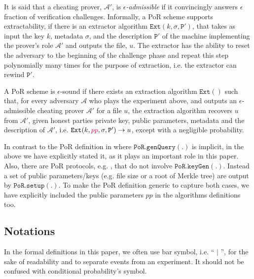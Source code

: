 It is said that a cheating prover, $\mathcal{A}'$, is \emph{$\epsilon$-admissible} if it convincingly answers $\epsilon$ fraction of verification challenges. Informally, a PoR scheme supports extractability, if there is an extractor algorithm $\mathtt{Ext}(k,\sigma, \mathtt{P}')$, that takes as input the key $k$, metadata $\sigma$, and the description $\mathtt{P}'$ of the  machine implementing the prover's role $\mathcal{A}'$ and outputs the file, $u$. The extractor has the ability to reset the adversary to the beginning of the challenge phase and repeat this step polynomially many times for the purpose of extraction, i.e. the extractor can rewind $\mathtt{P}'$.




\begin{definition}\label{extractable} A PoR scheme is $\epsilon$-sound if   there exists an extraction algorithm $\mathtt{Ext}()$ such that, for every adversary $\mathcal{A}$ who plays the experiment above, and outputs an $\epsilon$-admissible cheating prover $\mathcal{A}'$ for a file $u$,  the extraction algorithm  recovers $u$ from $\mathcal{A}'$, given honest parties private key, public parameters, metadata and the description of $\mathcal{A}'$,  i.e. $\mathtt{Ext}(k,{\color{purple}pp},\sigma, \mathtt{P}')\rightarrow u$, except with a negligible probability. 
\end{definition}








In contrast to the PoR definition in \cite{DBLP:journals/iacr/JuelsK07,DBLP:conf/asiacrypt/ShachamW08} where $\mathtt{PoR.genQuery}(.)$ is implicit, in the above we have explicitly stated  it, as it    plays an important role in this paper. Also, there are PoR protocols, e.g. \cite{MillerPermacoin}, that do not involve $\mathtt{PoR.keyGen}(.)$. Instead a set of public parameters/keys (e.g. file size or a root of Merkle tree) are output by $\mathtt{PoR.setup}(.)$. To make the PoR definition generic to capture both cases, we have explicitly included the public parameters $pp$ in the algorithms definitions too. 

\subsection{Notations} In the formal definitions in this paper, we often use bar symbol, i.e. `` $|$ '', for the sake of readability and to separate events from an experiment. It should not be confused with conditional probability's symbol. 


